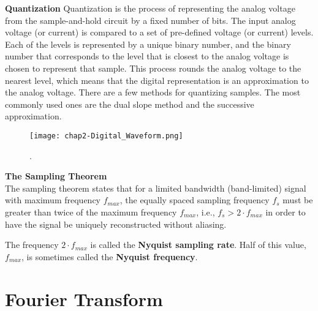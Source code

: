 \begin{compactitem}
\item \textbf{Quantization}
Quantization is the process of representing the analog voltage from the sample-and-hold circuit by a fixed number of bits. The input analog voltage (or current) is compared to a set of pre-defined voltage (or current) levels. Each of the levels is represented by a unique binary number, and the binary number that corresponds to the level that is closest to the analog voltage is chosen to represent that sample. This process rounds the analog voltage to the nearest level, which means that the digital representation is an approximation to the analog voltage. There are a few methods for quantizing samples. The most commonly used ones are the dual slope method and the successive approximation.

\begin{figure}[ht]
  \label{fig:chap2-Digital_Waveform}
  \centering
	\texttt{[image: chap2-Digital\_Waveform.png]}
	\caption{.}
\end{figure}


\item \textbf{The Sampling Theorem}\cite{dsp-nyquist}\\
The sampling theorem states that for a limited bandwidth (band-limited) signal with maximum frequency $f_{max}$, the equally spaced sampling frequency $f_s$ must be greater than twice of the maximum frequency $f_{max}$, i.e.,
$f_s > 2·f_{max}$
in order to have the signal be uniquely reconstructed without aliasing.

The frequency $2·f_{max}$ is called the \textbf{Nyquist sampling rate}. Half of this value, $f_{max}$, is sometimes called the \textbf{Nyquist frequency}.

\end{compactitem}

\section{Fourier Transform} \cite{csulb-Woollett}

